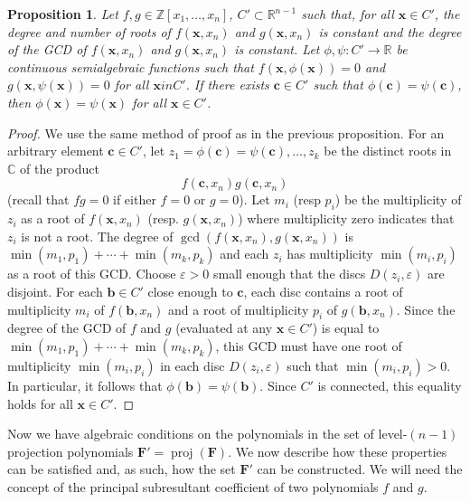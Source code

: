 \documentclass[
]{book}
\newtheorem{proposition}{Proposition}[chapter]
\theoremstyle{definition}
\theoremstyle{definition}
\theoremstyle{definition}
\theoremstyle{definition}
\theoremstyle{remark}
\begin{document}
\begin{proposition}
\citep[Proposition 2.18]{coste2000}
Let \(f,g \in \mathbb{Z}[x_1,\ldots,x_n]\), \(C' \subset \mathbb{R}^{n-1}\) such that, for all \(\mathbf{x} \in C'\), the degree and number of roots of \(f(\mathbf{x},x_n)\) and \(g(\mathbf{x},x_n)\) is constant and the degree of the GCD of \(f(\mathbf{x},x_n)\) and \(g(\mathbf{x},x_n)\) is constant.
Let \(\phi,\psi : C' \to \mathbb{R}\) be continuous semialgebraic functions such that \(f(\mathbf{x},\phi(\mathbf{x})) = 0\) and \(g(\mathbf{x},\psi(\mathbf{x})) = 0\) for all \(\mathbf{x} in C'\).
If there exists \(\mathbf{c} \in C'\) such that \(\phi(\mathbf{c}) = \psi(\mathbf{c})\), then \(\phi(\mathbf{x}) = \psi(\mathbf{x})\) for all \(\mathbf{x} \in C'\).
\end{proposition}

\begin{proof}
We use the same method of proof as in the previous proposition.
For an arbitrary element \(\mathbf{c} \in C'\), let \(z_1 = \phi(\mathbf{c}) = \psi(\mathbf{c}), \ldots, z_k\) be the distinct roots in \(\mathbb{C}\) of the product
\[
f(\mathbf{c},x_n) g(\mathbf{c},x_n)
\]
(recall that \(fg = 0\) if either \(f=0\) or \(g=0\)).
Let \(m_i\) (resp \(p_i\)) be the multiplicity of \(z_i\) as a root of \(f(\mathbf{x},x_n)\) (resp. \(g(\mathbf{x}, x_n)\)) where multiplicity zero indicates that \(z_i\) is not a root.
The degree of \(\gcd(f(\mathbf{x}, x_n), g(\mathbf{x}, x_n))\) is \(\min(m_1,p_1) + \cdots + \min(m_k,p_k)\) and each \(z_i\) has multiplicity \(\min(m_i,p_i)\) as a root of this GCD.
Choose \(\varepsilon > 0\) small enough that the discs \(D(z_i,\varepsilon)\) are disjoint.
For each \(\mathbf{b} \in C'\) close enough to \(\mathbf{c}\), each disc contains a root of multiplicity \(m_i\) of \(f(\mathbf{b}, x_n)\) and a root of multiplicity \(p_i\) of \(g(\mathbf{b}, x_n)\). Since the degree of the GCD of \(f\) and \(g\) (evaluated at any \(\mathbf{x} \in C'\)) is equal to \(\min(m_1,p_1) + \cdots + \min(m_k,p_k)\), this GCD must have one root of multiplicity \(\min(m_i,p_i)\) in each disc \(D(z_i,\varepsilon)\) such that \(\min(m_i,p_i) > 0\).
In particular, it follows that \(\phi(\mathbf{b}) = \psi(\mathbf{b})\). Since \(C'\) is connected, this equality holds for all \(\mathbf{x} \in C'\).
\end{proof}

Now we have algebraic conditions on the polynomials in the set of level-\((n-1)\) projection polynomials \(\mathbf{F}' = \operatorname{proj}(\mathbf{F})\). We now describe how these properties can be satisfied and, as such, how the set \(\mathbf{F}'\) can be constructed. We will need the concept of the principal subresultant coefficient of two polynomials \(f\) and \(g\).
\end{document}
